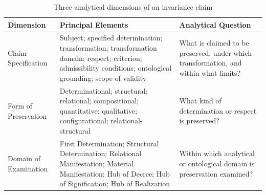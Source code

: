 %
%
%
%
%

\begin{table}[htbp]
    \centering
    \small
    \renewcommand{\arraystretch}{1.4}
    \setlength{\tabcolsep}{5pt}

    \caption{Three analytical dimensions of an invariance claim}
    \label{tab:consolidated-framework-of-invariance}

    \begin{tabular}{
        |p{}
        |p{}
        |p{}|
    }
        \hline

        \textbf{Dimension}
        &
        \textbf{Principal Elements}
        &
        \textbf{Analytical Question}
        \\ \hline

        Claim Specification
        &
        Subject; specified determination; transformation;
        transformation domain; respect; criterion;
        admissibility conditions; ontological grounding;
        scope of validity
        &
        What is claimed to be preserved, under which
        transformation, and within what limits?
        \\ \hline

        Form of Preservation
        &
        Determinational; structural; relational;
        compositional; quantitative; qualitative;
        configurational; relational-structural
        &
        What kind of determination or respect is
        preserved?
        \\ \hline

        Domain of Examination
        &
        First Determination; Structural Determination;
        Relational Manifestation; Material Manifestation;
        Hub of Decree; Hub of Signification;
        Hub of Realization
        &
        Within which analytical or ontological domain
        is preservation examined?
        \\ \hline

    \end{tabular}
\end{table}

